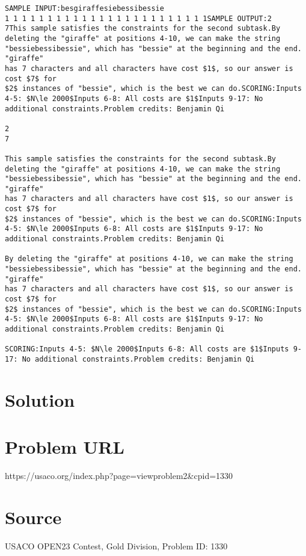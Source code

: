 \documentclass[12pt]{article}
\begin{document}
\begin{verbatim}
SAMPLE INPUT:besgiraffesiebessibessie
1 1 1 1 1 1 1 1 1 1 1 1 1 1 1 1 1 1 1 1 1 1 1 1SAMPLE OUTPUT:2
7This sample satisfies the constraints for the second subtask.By deleting the "giraffe" at positions 4-10, we can make the string
"bessiebessibessie", which has "bessie" at the beginning and the end. "giraffe"
has 7 characters and all characters have cost $1$, so our answer is cost $7$ for
$2$ instances of "bessie", which is the best we can do.SCORING:Inputs 4-5: $N\le 2000$Inputs 6-8: All costs are $1$Inputs 9-17: No additional constraints.Problem credits: Benjamin Qi

2
7

This sample satisfies the constraints for the second subtask.By deleting the "giraffe" at positions 4-10, we can make the string
"bessiebessibessie", which has "bessie" at the beginning and the end. "giraffe"
has 7 characters and all characters have cost $1$, so our answer is cost $7$ for
$2$ instances of "bessie", which is the best we can do.SCORING:Inputs 4-5: $N\le 2000$Inputs 6-8: All costs are $1$Inputs 9-17: No additional constraints.Problem credits: Benjamin Qi

By deleting the "giraffe" at positions 4-10, we can make the string
"bessiebessibessie", which has "bessie" at the beginning and the end. "giraffe"
has 7 characters and all characters have cost $1$, so our answer is cost $7$ for
$2$ instances of "bessie", which is the best we can do.SCORING:Inputs 4-5: $N\le 2000$Inputs 6-8: All costs are $1$Inputs 9-17: No additional constraints.Problem credits: Benjamin Qi

SCORING:Inputs 4-5: $N\le 2000$Inputs 6-8: All costs are $1$Inputs 9-17: No additional constraints.Problem credits: Benjamin Qi
\end{verbatim}

\section*{Solution}


\section*{Problem URL}
https://usaco.org/index.php?page=viewproblem2&cpid=1330

\section*{Source}
USACO OPEN23 Contest, Gold Division, Problem ID: 1330
\end{document}
